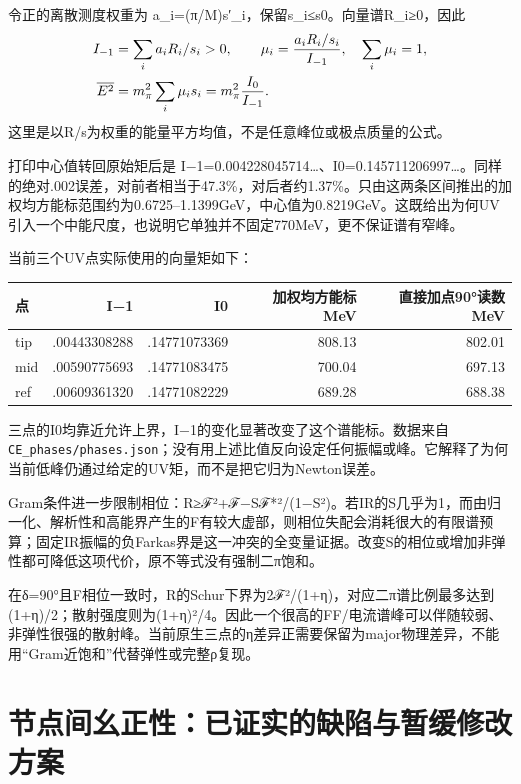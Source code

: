 \documentclass[
  11pt,
  a4paper,
]{article}
\newcounter{none} %
\begin{document}
令正的离散测度权重为 a\_i=(π/M)s′\_i，保留s\_i≤s0。向量谱R\_i≥0，因此 \[
\begin{aligned}
I_{-1}&=\sum_i a_iR_i/s_i>0,\qquad
\mu_i={a_iR_i/s_i\over I_{-1}},\quad\sum_i\mu_i=1,\\
\overline{E^2}&=m_\pi^2\sum_i\mu_i s_i=m_\pi^2{I_0\over I_{-1}}.
\end{aligned}
\] 这里是以R/s为权重的能量平方均值，不是任意峰位或极点质量的公式。

打印中心值转回原始矩后是
I−1=0.004228045714\ldots、I0=0.145711206997\ldots。同样的绝对.002误差，对前者相当于47.3\%，对后者约1.37\%。只由这两条区间推出的加权均方能标范围约为0.6725--1.1399GeV，中心值为0.8219GeV。这既给出为何UV引入一个中能尺度，也说明它单独并不固定770MeV，更不保证谱有窄峰。

当前三个UV点实际使用的向量矩如下：

{\def\LTcaptype{none} %
\begin{longtable}[]{@{}lrrrr@{}}
\toprule\noalign{}
点 & I−1 & I0 & 加权均方能标 MeV & 直接加点90°读数 MeV \\
\midrule\noalign{}
\endhead
\bottomrule\noalign{}
\endlastfoot
tip & .00443308288 & .14771073369 & 808.13 & 802.01 \\
mid & .00590775693 & .14771083475 & 700.04 & 697.13 \\
ref & .00609361320 & .14771082229 & 689.28 & 688.38 \\
\end{longtable}
}

三点的I0均靠近允许上界，I−1的变化显著改变了这个谱能标。数据来自
\texttt{CE\_phases/phases.json}；没有用上述比值反向设定任何振幅或峰。它解释了为何当前低峰仍通过给定的UV矩，而不是把它归为Newton误差。

Gram条件进一步限制相位：R≥\textbar ℱ\textbar²+\textbar ℱ−Sℱ*\textbar²/(1−\textbar S\textbar²)。若IR的S几乎为1，而由归一化、解析性和高能界产生的F有较大虚部，则相位失配会消耗很大的有限谱预算；固定IR振幅的负Farkas界是这一冲突的全变量证据。改变S的相位或增加非弹性都可降低这项代价，原不等式没有强制二π饱和。

在δ=90°且F相位一致时，R的Schur下界为2\textbar ℱ\textbar²/(1+η)，对应二π谱比例最多达到(1+η)/2；散射强度则为(1+η)²/4。因此一个很高的FF/电流谱峰可以伴随较弱、非弹性很强的散射峰。当前原生三点的η差异正需要保留为major物理差异，不能用``Gram近饱和''代替弹性或完整ρ复现。

\clearpage

\section{节点间幺正性：已证实的缺陷与暂缓修改方案}\label{ux8282ux70b9ux95f4ux5e7aux6b63ux6027ux5df2ux8bc1ux5b9eux7684ux7f3aux9677ux4e0eux6682ux7f13ux4feeux6539ux65b9ux6848}
\end{document}
